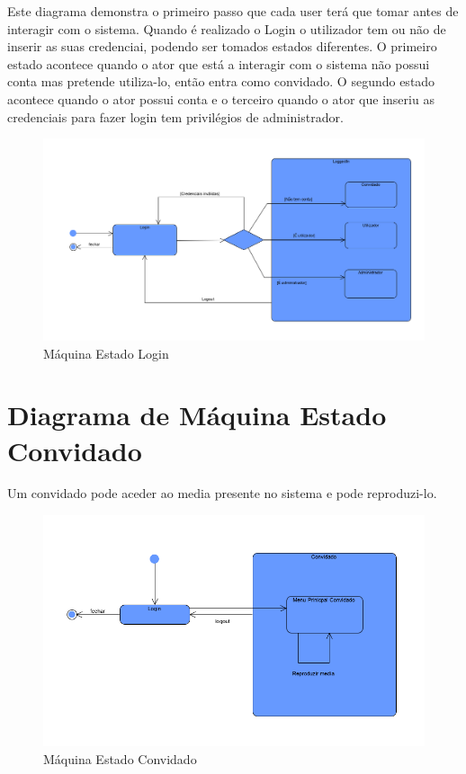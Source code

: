 \documentclass[a4paper]{report}
\begin{document}
Este diagrama demonstra o primeiro passo que cada user terá que tomar antes de 
interagir com o sistema. Quando é realizado o Login o utilizador tem ou não de 
inserir as suas credenciai, podendo ser tomados estados
diferentes. O primeiro estado acontece quando o ator que está a interagir
com o sistema não possui conta mas pretende utiliza-lo, então entra como
convidado. O segundo estado acontece quando o ator possui conta e o terceiro
quando o ator que inseriu as credenciais para fazer login tem privilégios de 
administrador.

\begin{figure}[H]
	\centering 
    \includegraphics[width=\textwidth]{images/maqLogin.png}  
    \caption{Máquina Estado Login}
\end{figure}

\section{Diagrama de Máquina Estado Convidado}

Um convidado pode aceder ao media presente no sistema e pode reproduzi-lo.

\begin{figure}[H]
	\centering 
    \includegraphics[width=\textwidth]{images/maqConvidado.png}  
    \caption{Máquina Estado Convidado}
\end{figure}
\end{document}
